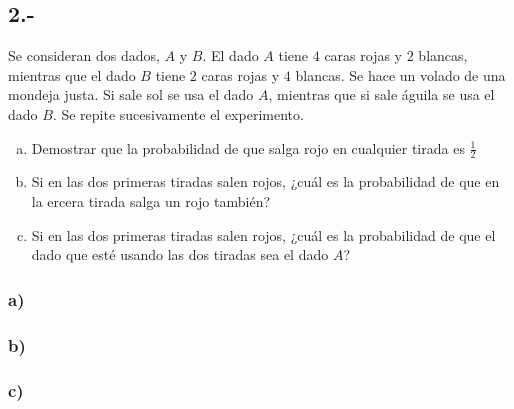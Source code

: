 \documentclass{article}
\begin{document}
\subsection*{2.-}
Se consideran dos dados, $A$ y $B$. El dado $A$ tiene $4$ caras rojas y $2$ blancas, mientras que el dado 
$B$ tiene $2$ caras rojas y $4$ blancas. Se hace un volado de una mondeja justa. 
Si sale sol se usa el dado $A$, mientras que si sale águila se usa el dado $B$. Se repite sucesivamente el experimento.
\begin{enumerate}[a)]
    \item Demostrar que la probabilidad de que salga rojo en cualquier tirada es $\frac{1}{2}$
    \item Si en las dos primeras tiradas salen rojos, ¿cuál es la probabilidad de que en la ercera tirada salga un rojo también?
    \item Si en las dos primeras tiradas salen rojos, ¿cuál es la probabilidad de que el dado que esté usando las dos tiradas sea el dado $A$?
\end{enumerate}
\begin{tcolorbox}[breakable]
    \subsubsection*{a)}

    \subsubsection*{b)}

    \subsubsection*{c)}
\end{tcolorbox}
\end{document}
